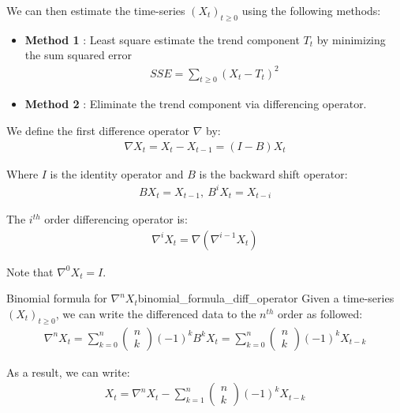 \noindent We can then estimate the time-series $(X_t)_{t\ge0}$ using the following methods:
\begin{itemize}
    \item \textbf{Method 1} : Least square estimate the trend component $T_t$ by minimizing the sum squared error
    \begin{align*}
        SSE = \sum_{t\ge0} (X_t - T_t)^2
    \end{align*}
    \item \textbf{Method 2} : Eliminate the trend component via differencing operator.
\end{itemize}

\begin{definition}
    We define the first difference operator $\nabla$ by:
    \begin{align*}
        \nabla X_t = X_t - X_{t-1} = (I-B)X_t
    \end{align*}

    \noindent Where $I$ is the identity operator and $B$ is the backward shift operator:
    \begin{align*}
        BX_t = X_{t-1}, \ B^i X_t = X_{t-i}
    \end{align*}

    \noindent The $i^{th}$ order differencing operator is:
    \begin{align*}
        \nabla^i X_t = \nabla(\nabla^{i-1}X_t)
    \end{align*}

    \noindent Note that $\nabla^0X_t = I$.
\end{definition}

\begin{proposition}{Binomial formula for $\nabla^nX_t$}{binomial_formula_diff_operator}
    Given a time-series $(X_t)_{t\ge0}$, we can write the differenced data to the $n^{th}$ order as followed:
    \begin{align*}
        \nabla^nX_t = \sum_{k=0}^n \begin{pmatrix}
            n \\ k
        \end{pmatrix}(-1)^{k}B^k X_t =  \sum_{k=0}^n \begin{pmatrix}
            n \\ k
        \end{pmatrix}(-1)^{k} X_{t-k}
    \end{align*}

    \noindent As a result, we can write:
    \begin{align*}
        X_t = \nabla^nX_t - \sum_{k=1}^n \begin{pmatrix} n \\ k \end{pmatrix} (-1)^k X_{t-k}
    \end{align*}
\end{proposition}

